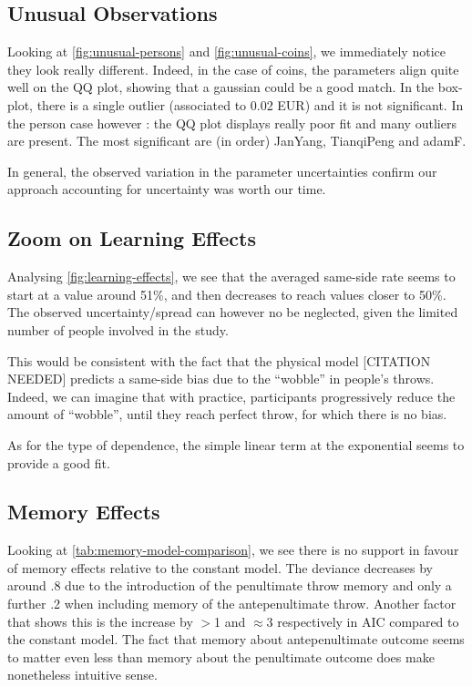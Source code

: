 \documentclass[a4paper, 12pt,oneside]{article}
\begin{document}
		\subsection{Unusual Observations}
			Looking at \ref{fig:unusual-persons} and \ref{fig:unusual-coins}, we immediately notice they look really different. Indeed, in the case of coins, the parameters align quite well on the QQ plot, showing that a gaussian could be a good match. In the box-plot, there is a single outlier (associated to 0.02 EUR) and it is not significant. In the person case however : the QQ plot displays really poor fit and  many outliers are present. The most significant are (in order) JanYang, TianqiPeng and adamF. 

			In general, the observed variation in the parameter uncertainties confirm our approach accounting for uncertainty was worth our time. 
		\subsection{Zoom on Learning Effects}\label{sec:disc-learning-effects}
			Analysing \ref{fig:learning-effects}, we see that the averaged same-side rate seems to start at a value around 51\%, and then decreases to reach values closer to 50\%. The observed uncertainty/spread can however no be neglected, given the limited number of people involved in the study. 
			
			This would be consistent with the fact that the physical model [CITATION NEEDED] predicts a same-side bias due to the ``wobble'' in people's throws. Indeed, we can imagine that with practice, participants progressively reduce the amount of ``wobble'', until they reach perfect throw, for which there is no bias. 

			As for the type of dependence, the simple linear term at the exponential seems to provide a good fit.  
		\subsection{Memory Effects}
		Looking at \ref{tab:memory-model-comparison}, we see there is no support in favour of memory effects relative to the constant model. The deviance decreases by around .8 due to the introduction of the penultimate throw memory and only a further .2 when including memory of the antepenultimate throw. Another factor that shows this is the increase by $>$1 and $\approx 3$ respectively in AIC compared to the constant model.
		The fact that memory about antepenultimate outcome seems to matter even less than memory about the penultimate outcome does make nonetheless intuitive sense. 
\end{document}
